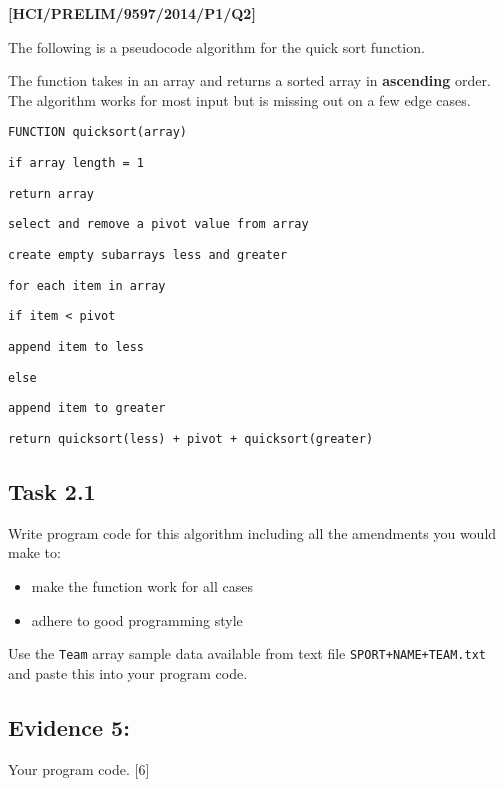 \item \textbf{{[}HCI/PRELIM/9597/2014/P1/Q2{]} }

The following is a pseudocode algorithm for the quick sort function. 

The function takes in an array and returns a sorted array in \textbf{ascending}
order. The algorithm works for most input but is missing out on a
few edge cases. 

\noindent %
\noindent\begin{minipage}[t]{1\columnwidth}%
\texttt{FUNCTION quicksort(array) }

\texttt{\qquad{}if array length = 1 }

\texttt{\qquad{}\qquad{}return array }

\texttt{\qquad{}select and remove a pivot value from array }

\texttt{\qquad{}create empty subarrays less and greater }

\texttt{\qquad{}for each item in array}

\texttt{\qquad{}\qquad{}if item < pivot }

\texttt{\qquad{}\qquad{}\qquad{}append item to less }

\texttt{\qquad{}\qquad{}else }

\texttt{\qquad{}\qquad{}\qquad{}append item to greater}

\texttt{\qquad{}return quicksort(less) + pivot + quicksort(greater) }%
\end{minipage}

\subsection*{Task 2.1 }

Write program code for this algorithm including all the amendments
you would make to: 
\begin{itemize}
\item make the function work for all cases 
\item adhere to good programming style 
\end{itemize}
Use the \texttt{Team} array sample data available from text file \texttt{SPORT+NAME+TEAM.txt}
and paste this into your program code.

\subsection*{Evidence 5: }

Your program code.\hfill{} {[}6{]}

